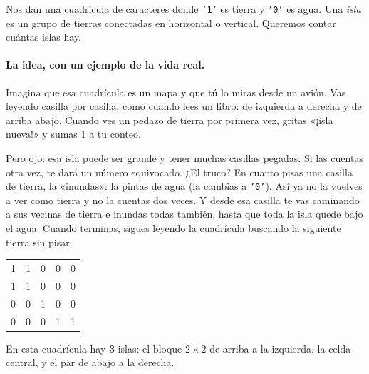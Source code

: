
Nos dan una cuadrícula de caracteres donde \texttt{'1'} es tierra y
\texttt{'0'} es agua. Una \emph{isla} es un grupo de tierras conectadas en
horizontal o vertical. Queremos contar cuántas islas hay.

\paragraph{La idea, con un ejemplo de la vida real.} Imagina que esa cuadrícula es
un mapa y que tú lo miras desde un avión. Vas leyendo casilla por casilla, como
cuando lees un libro: de izquierda a derecha y de arriba abajo. Cuando ves un
pedazo de tierra por primera vez, gritas «¡isla nueva!» y sumas 1 a tu conteo.

Pero ojo: esa isla puede ser grande y tener muchas casillas pegadas. Si las
cuentas otra vez, te dará un número equivocado. ¿El truco? En cuanto pisas una
casilla de tierra, la «inundas»: la pintas de agua (la cambias a \texttt{'0'}).
Así ya no la vuelves a ver como tierra y no la cuentas dos veces. Y desde esa
casilla te vas caminando a sus vecinas de tierra e inundas todas también, hasta
que toda la isla quede bajo el agua. Cuando terminas, sigues leyendo la cuadrícula
buscando la siguiente tierra sin pisar.

\begin{center}
\ttfamily
\begin{tabular}{ccccc}
1 & 1 & 0 & 0 & 0\\
1 & 1 & 0 & 0 & 0\\
0 & 0 & 1 & 0 & 0\\
0 & 0 & 0 & 1 & 1\\
\end{tabular}
\end{center}

\noindent En esta cuadrícula hay \textbf{3} islas: el bloque $2\times2$ de
arriba a la izquierda, la celda central, y el par de abajo a la derecha.

